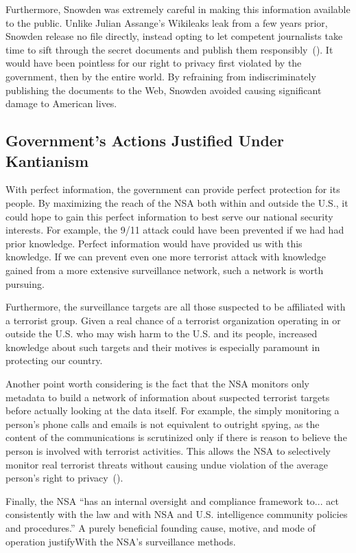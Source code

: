 \documentclass[12pt,letterpaper]{article}
\renewcommand{\citep}[1]{(\cite{#1})}
\begin{document}
Furthermore, Snowden was extremely careful in making this information available
to the public. Unlike Julian Assange's Wikileaks leak from a few years prior,
Snowden release no file directly, instead opting to let competent journalists
take time to sift through the secret documents and publish them
responsibly~\citep{rusbridger2014}. It would have been pointless for our right
to privacy first violated by the government, then by the entire world. By
refraining from indiscriminately publishing the documents to the Web, Snowden
avoided causing significant damage to American lives.


\subsection*{Government's Actions Justified Under Kantianism}

With perfect information, the government can provide perfect protection for its
people. By maximizing the reach of the NSA both within and outside the U.S., it
could hope to gain this perfect information to best serve our national security
interests. For example, the 9/11 attack could have been prevented if we had had
prior knowledge. Perfect information would have provided us with this
knowledge. If we can prevent even one more terrorist attack with knowledge
gained from a more extensive surveillance network, such a network is worth
pursuing.

Furthermore, the surveillance targets are all those suspected to be affiliated
with a terrorist group. Given a real chance of a terrorist organization
operating in or outside the U.S. who may wish harm to the U.S. and its people,
increased knowledge about such targets and their motives is especially
paramount in protecting our country.

Another point worth considering is the fact that the NSA monitors only metadata
to build a network of information about suspected terrorist targets before
actually looking at the data itself. For example, the simply monitoring
a person's phone calls and emails is not equivalent to outright spying, as the
content of the communications is scrutinized only if there is reason to believe
the person is involved with terrorist activities. This allows the NSA to
selectively monitor real terrorist threats without causing undue violation of
the average person's right to privacy~\citep{nsa2013}.

Finally, the NSA ``has an internal oversight and compliance framework to... act
consistently with the law and with NSA and U.S. intelligence community policies
and procedures.'' A purely beneficial founding cause, motive, and mode of
operation justifyWith  the NSA's surveillance methods.
\end{document}
